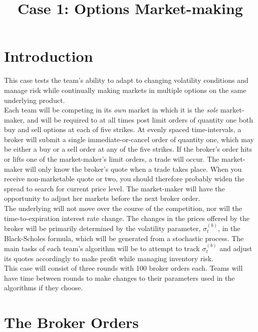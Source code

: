 \documentclass{amsart}
\renewcommand{\_}[1]{\underline{ #1 }}
\theoremstyle{definition}
\numberwithin{equation}{subsection}
\begin{document}
\title{Case 1: Options Market-making}
\maketitle

\section{Introduction}

\setlength{\parindent}{0.5cm}
This case tests the team's ability to adapt to changing volatility conditions and manage risk while continually making markets in multiple options on the same underlying product. 
\\

Each team will be competing in its {\it own} market in which it is the {\it sole} market-maker, and will be required to at all times post limit orders of quantity one both buy and sell options at each of five strikes. At evenly spaced time-intervals, a broker will submit a single immediate-or-cancel order of quantity one, which may be either a buy or a sell order at any of the five strikes. If the broker's order hits or lifts one of the market-maker's limit orders, a trade will occur. The market-maker will only know the broker's quote when a trade takes place. When you receive non-marketable quote or two, you should therefore probably widen the spread to search for current price level. The market-maker will have the opportunity to adjust her markets before the next broker order. 
\\

The underlying will not move over the course of the competition, nor will the time-to-expiration interest rate change. The changes in the prices offered by the broker will be primarily determined by the volatility parameter, $\sigma_t^{(b)}$, in the Black-Scholes formula, which will be generated from a stochastic process. The main tasks of each team's algorithm will be to attempt to track $\sigma_t^{(b)}$ and adjust its quotes accordingly to make profit while managing inventory risk. 
\\

This case will consist of three rounds with 100 broker orders each. Teams will have time between rounds to make changes to their parameters used in the algorithms if they choose. 


\section{The Broker Orders}
\end{document}
